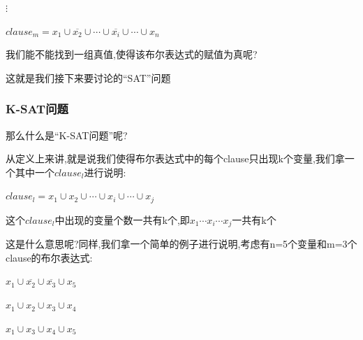             \begin{center}
                $\vdots$
            \end{center}

            \begin{center}
                $clause_{m} = x_{1} \cup \overline{x_{2}} \cup \cdots \cup \overline{x_{i}} \cup \cdots \cup x_{n}$
            \end{center}


            \par
            我们能不能找到一组真值,使得该布尔表达式的赋值为真呢?
            \par
            这就是我们接下来要讨论的``SAT''问题
        \subsubsection{K-SAT问题}
            那么什么是``K-SAT问题''呢?\par
                从定义上来讲,就是说我们使得布尔表达式中的每个clause只出现k个变量,我们拿一个其中一个$clause_{l}$进行说明:

        \begin{center}
            $clause_{l}=x_{1} \cup x_{2} \cup \cdots \cup x_{i} \cup \cdots \cup x_{j}$
        \end{center}

        \par
            这个$clause_{l}$中出现的变量个数一共有k个,即$x_{1}\cdots x_{i} \cdots x_{j}$一共有k个\par
            这是什么意思呢?同样,我们拿一个简单的例子进行说明,考虑有n=5个变量和m=3个clause的布尔表达式:

        \begin{center}
            $x_{1} \cup \overline{x_{2}} \cup \overline{x_{3}} \cup x_{5}$
        \end{center}

        \begin{center}
            $x_{1} \cup x_{2} \cup x_{3} \cup x_{4}$
        \end{center}

        \begin{center}
            $x_{1} \cup x_{3} \cup x_{4} \cup x_{5}$
        \end{center}

